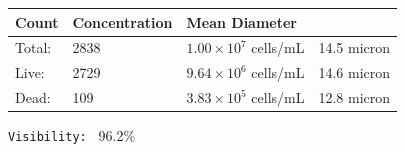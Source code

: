\documentclass[UTF8,10pt,a4paper,fontset=fandol]{ctexart}
\newcommand{\fieldvalue}[1]{#1}
\begin{document}
\begin{tabularx}{\textwidth}{@{}lXX>{\raggedright\arraybackslash}X@{}}
\textbf{Count} & \textbf{Concentration} & \textbf{Mean Diameter} \\
\hline
Total:
&
\fieldvalue{2838}
&
\fieldvalue{$1.00 \times 10^{7}$ cells/mL}
&
\fieldvalue{14.5 micron}
\\
Live:
&
\fieldvalue{2729}
&
\fieldvalue{$9.64 \times 10^{6}$ cells/mL}
&
\fieldvalue{14.6 micron}
\\
Dead:
&
\fieldvalue{109}
&
\fieldvalue{$3.83 \times 10^{5}$ cells/mL}
&
\fieldvalue{12.8 micron}
\end{tabularx}

\medskip
\noindent\texttt{Visibility: }%
\fieldvalue{96.2\%}

\medskip

\noindent
\begin{minipage}[t]{0.45\textwidth}
\centering
\fbox{\rule{0pt}{1.55in}\rule{0.9\linewidth}{0pt}}

\vspace{0.35in}

\fbox{\rule{0pt}{1.55in}\rule{0.9\linewidth}{0pt}}
\end{minipage}
\hfill
\begin{minipage}[t]{0.45\textwidth}
\centering
\fbox{\rule{0pt}{1.55in}\rule{0.9\linewidth}{0pt}}

\vspace{0.35in}

\fbox{\rule{0pt}{1.55in}\rule{0.9\linewidth}{0pt}}
\end{minipage}

\vfill
\end{document}

